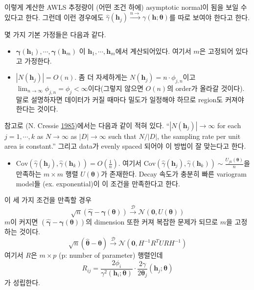 \documentclass[b5paper,]{book}
\providecommand{\tightlist}{%
  \setlength{\itemsep}{0pt}\setlength{\parskip}{0pt}}
\theoremstyle{definition}
\theoremstyle{definition}
\theoremstyle{definition}
\theoremstyle{remark}
\begin{document}
이렇게 계산한 AWLS 추정량이 (어떤 조건 하에) asymptotic normal이 됨을
보일 수 있다고 한다. 그런데 이런 경우에도
\(\hat{\gamma}(\mathbf{h}_{j}) \stackrel{n \rightarrow}{\rightarrow} \gamma(\mathbf{h};\boldsymbol{\theta})\)를
따로 보여야 한다고 한다.

몇 가지 기본 가정들은 다음과 같다.

\begin{itemize}
\item
  \(\mathbf{\gamma}(\mathbf{h}_{1}), \cdots , \mathbf{\gamma}(\mathbf{h}_{m})\)
  이 \(\mathbf{h}_{1}, \cdots , \mathbf{h}_{m}\)에서 계산되어있다.
  여기서 \(m\)은 고정되어 있다고 가정한다.
\item
  \(|N(\mathbf{h}_{j})|=O(n)\). 좀 더 자세하게는
  \(N(\mathbf{h}_{j})=n\cdot \phi_{j,n}\)이고
  \(\lim_{n \rightarrow \infty}\phi_{j,n}=\phi_{j} < \infty\)이다(그렇지
  않으면 \(O(n)\)의 order가 올라갈 것이다). 말로 설명하자면 데이터가
  커질 때마다 밀도가 일정해야 하므로 region도 커져야 한다는 것이다.
\end{itemize}

참고로 (N. Cressie \protect\hyperlink{ref-Cressie1985}{1985})에서는
다음과 같이 적혀 있다. ``\(|N(\mathbf{h}_{j})| \rightarrow \infty\) for
each \(j=1, \cdots, k\) as \(N \rightarrow \infty\) as
\(|D| \rightarrow \infty\) such that \(N/|D|\), the sampling rate per
unit area is constant.'' 그리고 data가 evenly spaced 되어야 이 방법이 잘
맞는다고 한다.

\begin{itemize}
\tightlist
\item
  \(\text{Cov}(\hat{\gamma}(\mathbf{h}_{j}), \hat{\gamma}(\mathbf{h}_{k}))=O(\frac{1}{n})\).
  여기서
  \(\text{Cov}(\hat{\gamma}(\mathbf{h}_{j}), \hat{\gamma}(\mathbf{h}_{k})) \sim \frac{U_{jk}(\boldsymbol{\theta})}{n}\)을
  만족하는 \(m \times m\) 행렬 \(U(\boldsymbol{\theta})\)가 존재한다.
  Decay 속도가 충분히 빠른 variogram model들 (ex. exponential)이 이
  조건을 만족한다고 한다.
\end{itemize}

이 세 가지 조건을 만족할 경우
\[\sqrt{n}(\hat{\boldsymbol{\gamma}}-\boldsymbol{\gamma}(\boldsymbol{\theta}))  \stackrel{\mathcal{D}}{\rightarrow} \mathcal{N}(\mathbf{0}, U(\boldsymbol{\theta}))\]
\(m\)이 커지면
\((\hat{\boldsymbol{\gamma}}-\boldsymbol{\gamma}(\boldsymbol{\theta}))\)의
dimension 또한 커져 복잡한 문제가 되므로 \(m\)을 고정하는 것이다.
\[\sqrt{n}(\hat{\boldsymbol{\theta}}-\boldsymbol{\theta})  \stackrel{\mathcal{D}}{\rightarrow} \mathcal{N}(\mathbf{0}, H^{-1}R^{T}URH^{-1})\]
여기서 \(R\)은 \(m \times p\) (p: number of parameter) 행렬인데
\[R_{ij}=\frac{2\phi_{i}}{\gamma^{2}(\mathbf{h}_{i};\boldsymbol{\theta})}\cdot \frac{2\gamma}{2\boldsymbol{\theta}_{j}}(\mathbf{h}_{j};\boldsymbol{\theta})\]
가 성립한다.
\end{document}

